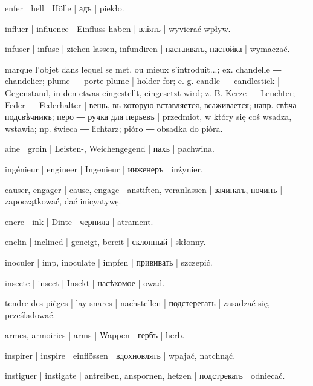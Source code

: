 \begin{outdent}{1em}
enfer | hell | Hölle | адъ | piekło.

influer | influence | Einfluss haben | вліять | wyvierać
wpływ.

infuser | infuse | ziehen lassen, infundiren | настаивать,
настойка | wymaczać.

marque l’objet dans lequel se met, ou mieux s’introduit...;
ex.  chandelle ―  chandelier;  plume
―  porte-plume | holder for; e. g.  candle ―
 candlestick | Gegenstand, in den etwas eingestellt,
eingesetzt wird; z. B.  Kerze ―  Leuchter;
 Feder ―  Federhalter | вещь, въ которую
вставляется, всаживается; напр.  свѣча ― 
подсвѣчникъ;  перо ―  ручка для перьевъ | przedmiot, w który się coś wsadza, wstawia; np.  świeca ―  lichtarz;  pióro ―  obsadka do pióra.

aine | groin | Leisten-, Weichengegend | пахъ | pachwina.

ingénieur | engineer | Ingenieur | инженеръ | inźynier.

causer, engager | cause, engage | anstiften, veranlassen | зачинать, починъ | zapoczątkować, dać inicyatywę.

encre | ink | Dinte | чернила | atrament.

enclin | inclined | geneigt, bereit | склонный | skłonny.

inoculer | imp, inoculate | impfen | прививать | szczepić.

insecte | insect | Insekt | насѣкомое | owad.

tendre des pièges | lay snares | nachstellen | подстерегать | zasadzać się, prześladować.

armes, armoiries | arms | Wappen | гербъ | herb.

inspirer | inspire | einflössen | вдохновлять | wpajać, natchnąć.

instiguer | instigate | antreiben, anspornen, hetzen | подстрекать | odniecać.


\end{outdent}
